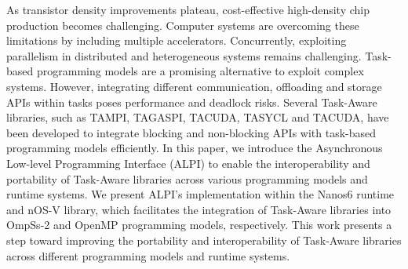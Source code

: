 As transistor density improvements plateau, cost-effective high-density chip production becomes challenging. Computer systems are overcoming these limitations by including multiple accelerators. Concurrently, exploiting parallelism in distributed and heterogeneous systems remains challenging. Task-based programming models are a promising alternative to exploit complex systems. However, integrating different communication, offloading and storage APIs within tasks poses performance and deadlock risks. Several Task-Aware libraries, such as TAMPI, TAGASPI, TACUDA, TASYCL and TACUDA, have been developed to integrate blocking and non-blocking APIs with task-based programming models efficiently. In this paper, we introduce the Asynchronous Low-level Programming Interface (ALPI) to enable the interoperability and portability of Task-Aware libraries across various programming models and runtime systems. We present ALPI's implementation within the Nanos6 runtime and nOS-V library, which facilitates the integration of Task-Aware libraries into OmpSs-2 and OpenMP programming models, respectively. This work presents a step toward improving the portability and interoperability of Task-Aware libraries across different programming models and runtime systems. 
